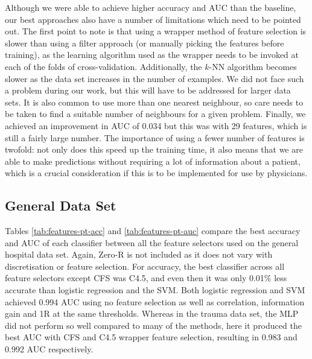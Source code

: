 Although we were able to achieve higher accuracy and AUC than the baseline,
our best approaches also have a number of limitations which need to be pointed
out. The first point to note is that using a wrapper method of feature
selection is slower than using a filter approach (or manually picking the
features before training), as the learning algorithm used as the wrapper
needs to be invoked at each of the folds of cross-validation. Additionally,
the $k$-NN algorithm becomes slower as the data set increases in the number
of examples. We did not face such a problem during our work, but this will
have to be addressed for larger data sets. It is also common to use more
than one nearest neighbour, so care needs to be taken to find a suitable number
of neighbours for a given problem. Finally, we achieved an improvement
in AUC of 0.034 but this was with 29 features, which is still a fairly large
number. The importance of using a fewer number of features is twofold: not
only does this speed up the training time, it also means that we are able to
make predictions without requiring a lot of information about a patient,
which is a crucial consideration if this is to be implemented for use by
physicians.

\subsection{General Data Set}
Tables \ref{tab:features-pt-acc} and \ref{tab:features-pt-auc} compare the
best accuracy and AUC of each classifier between all the feature selectors
used on the general hospital data set. Again, Zero-R is not included as it
does not vary with discretisation or feature selection. For accuracy, the
best classifier across all feature selectors except CFS was C4.5, and even
then it
was only 0.01\% less accurate than logistic regression and the SVM. Both
logistic regression and SVM achieved 0.994 AUC using no feature selection
as well as correlation, information gain and 1R at the same thresholds. Whereas
in the trauma data set, the MLP did not perform so well compared to many of the
methods, here it produced the best AUC with CFS and C4.5 wrapper feature
selection, resulting in 0.983 and 0.992 AUC respectively.



